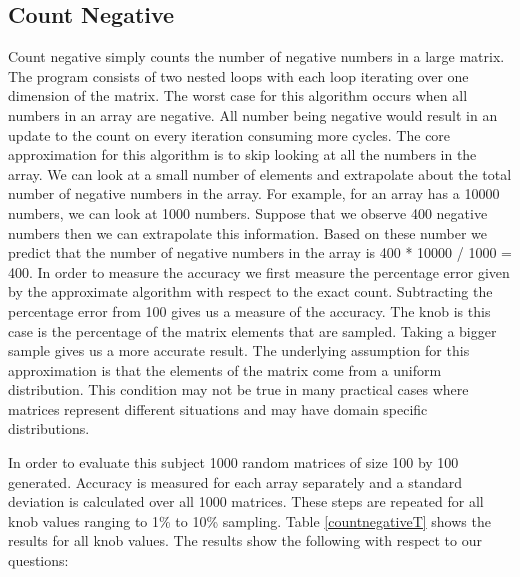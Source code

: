 \subsection{Count Negative}
Count negative simply counts the number of negative numbers in a large matrix. The program consists of two nested loops with each loop iterating over one dimension of the matrix. The worst case for this algorithm occurs when all numbers in an array are negative. All number being negative would result in an update to the count on every iteration consuming more cycles. The core approximation for this algorithm is to skip looking at all the numbers in the array. We can look at a small number of elements and extrapolate about the total number of negative numbers in the array. For example, for an array has a 10000 numbers, we can look at 1000 numbers. Suppose that we observe 400 negative numbers then we can extrapolate this information. Based on these number we predict that the number of negative numbers in the array is 400 * 10000 / 1000 = 400. In order to measure the accuracy we first measure the percentage error given by the approximate algorithm with respect to the exact count. Subtracting the percentage error from 100 gives us a measure of the accuracy. The knob is this case is the percentage of the matrix elements that are sampled. Taking a bigger sample gives us a more accurate result. The underlying assumption for this approximation is that the elements of the matrix come from a uniform distribution. This condition may not be true in many practical cases where matrices represent different situations and may have domain specific distributions.

In order to evaluate this subject 1000 random matrices of size 100 by 100 generated. Accuracy is measured for each array separately and a standard deviation is calculated over all 1000 matrices. These steps are repeated for all knob values ranging to 1\% to 10\% sampling. Table \ref{countnegativeT} shows the results for all knob values. The results show the following with respect to our questions:



